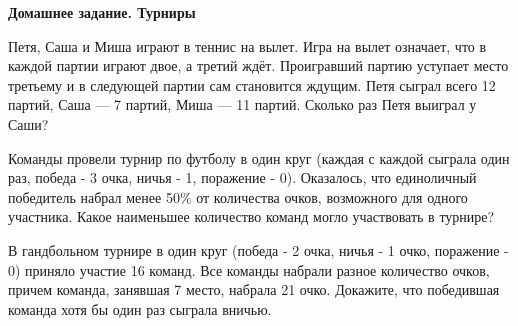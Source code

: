 \hspace{3mm}

\centerline{\bf \Huge Домашнее задание. Турниры}

\hspace{3mm}

 Петя, Саша и Миша играют в теннис на вылет. Игра на вылет означает, что в каждой партии играют двое, а третий ждёт. Проигравший партию уступает место третьему и в следующей партии сам становится ждущим. Петя сыграл всего 12 партий, Саша — 7 партий, Миша — 11 партий. Сколько раз Петя выиграл у Саши?

\hspace{3mm}

 Команды провели турнир по футболу в один круг (каждая с каждой сыграла один раз, победа - 3 очка, ничья - 1, поражение - 0). Оказалось, что единоличный победитель набрал менее 50\% от количества очков, возможного для одного участника. Какое наименьшее количество команд могло участвовать в турнире?

\hspace{3mm}

 В гандбольном турнире в один круг (победа - 2 очка, ничья - 1 очко, поражение - 0) приняло участие 16 команд. Все команды набрали разное количество очков, причем команда, занявшая 7 место, набрала 21 очко. Докажите, что победившая команда хотя бы один раз сыграла вничью.